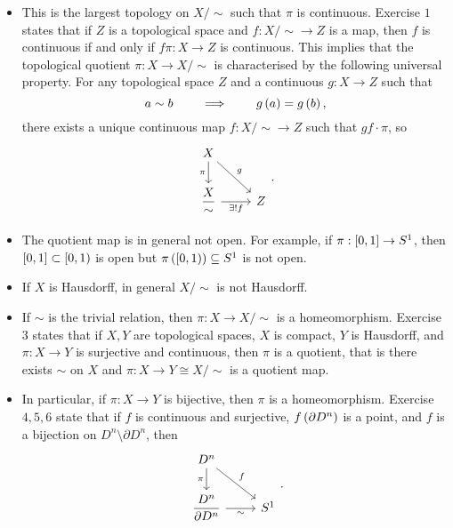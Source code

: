 \begin{remark*}
\hfill
\begin{itemize}
\item This is the largest topology on $ X / \sim $ such that $ \pi $ is continuous. Exercise $ 1 $ states that if $ Z $ is a topological space and $ f : X / \sim \to Z $ is a map, then $ f $ is continuous if and only if $ f\pi : X \to Z $ is continuous. This implies that the topological quotient $ \pi : X \to X / \sim $ is characterised by the following universal property. For any topological space $ Z $ and a continuous $ g : X \to Z $ such that
$$ a \sim b \qquad \implies \qquad g\rb{a} = g\rb{b}, $$
there exists a unique continuous map $ f : X / \sim \to Z $ such that $ g f \cdot \pi $, so
$$
\begin{tikzcd}
X \arrow[swap]{d}{\pi} \arrow{dr}{g} & \\
\dfrac{X}{\sim} \arrow[swap]{r}{\exists !f} & Z
\end{tikzcd}.
$$
\item The quotient map is in general not open. For example, if $ \pi : \sb{0, 1} \to S^1 $, then $ \sb{0, 1} \subset [0, 1) $ is open but $ \pi\rb{[0, 1)} \subseteq S^1 $ is not open.
\item If $ X $ is Hausdorff, in general $ X / \sim $ is not Hausdorff.
\item If $ \sim $ is the trivial relation, then $ \pi : X \to X / \sim $ is a homeomorphism. Exercise $ 3 $ states that if $ X, Y $ are topological spaces, $ X $ is compact, $ Y $ is Hausdorff, and $ \pi : X \to Y $ is surjective and continuous, then $ \pi $ is a quotient, that is there exists $ \sim $ on $ X $ and $ \pi : X \to Y \cong X / \sim $ is a quotient map.
\item In particular, if $ \pi : X \to Y $ is bijective, then $ \pi $ is a homeomorphism. Exercise $ 4, 5, 6 $ state that if $ f $ is continuous and surjective, $ f\rb{\partial D^n} $ is a point, and $ f $ is a bijection on $ D^n \setminus \partial D^n $, then
$$
\begin{tikzcd}
D^n \arrow{dr}{f} \arrow[swap]{d}{\pi} & \\
\dfrac{D^n}{\partial D^n} \arrow[swap]{r}{\sim} & S^1
\end{tikzcd}.
$$
\end{itemize}
\end{remark*}


